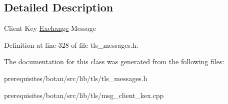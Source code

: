 \subsection{Detailed Description}
Client Key \mbox{\hyperlink{struct_exchange}{Exchange}} Message 

Definition at line 328 of file tls\+\_\+messages.\+h.



The documentation for this class was generated from the following files\+:\begin{DoxyCompactItemize}
\item 
prerequisites/botan/src/lib/tls/tls\+\_\+messages.\+h\item 
prerequisites/botan/src/lib/tls/msg\+\_\+client\+\_\+kex.\+cpp\end{DoxyCompactItemize}
